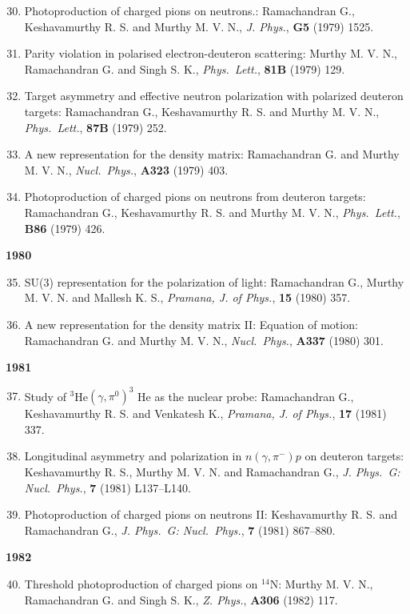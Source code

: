 \begin{enumerate}
\setcounter{enumi}{29}
\item Photoproduction of charged pions on neutrons.: Ramachandran G., Keshavamurthy R. S. and Murthy M. V. N., \textit{J. Phys.}, {\bf G5} (1979) 1525.
\item Parity violation in polarised electron-deuteron scattering: Murthy M. V. N., Ramachandran G. and Singh S. K., \textit{Phys.\ Lett.}, {\bf 81B} (1979) 129.
\item Target asymmetry and effective neutron polarization with polarized deuteron targets: Ramachandran G., Keshavamurthy R. S. and Murthy M. V. N., \textit{Phys.\ Lett.}, {\bf 87B} (1979) 252.
\item A new representation for the density matrix: Ramachandran G. and Murthy M. V. N., \textit{Nucl.\ Phys.}, {\bf A323} (1979) 403.
\item Photoproduction of charged pions on neutrons from deuteron targets: Ramachandran G., Keshavamurthy R. S. and Murthy M. V. N., \textit{Phys.\ Lett.}, {\bf B86} (1979) 426.
\end{enumerate}
\textbf{1980}
\begin{enumerate}
\setcounter{enumi}{34}
\item SU(3) representation for the polarization of light: Ramachandran G., Murthy M. V. N. and Mallesh K. S., \textit{Pramana, J. of Phys.}, {\bf 15} (1980) 357.
\item A new representation for the density matrix II: Equation of motion: Ramachandran G. and Murthy M. V. N., \textit{Nucl.\ Phys.}, {\bf A337} (1980) 301.
\end{enumerate}
\textbf{1981}
\begin{enumerate}
\setcounter{enumi}{36}
\item Study of $^{3}$He$(\gamma,\pi^{0})^{3}$ He as the nuclear probe: Ramachandran G., Keshavamurthy R. S. and Venkatesh K., \textit{Pramana, J. of Phys.}, {\bf 17} (1981) 337.
\item Longitudinal asymmetry and polarization in $n(\gamma,\pi^{-})p$ on deuteron targets: Keshavamurthy R. S., Murthy M. V. N. and Ramachandran G., \textit{J. Phys.\ G: Nucl.\ Phys.}, {\bf 7} (1981) L137--L140.
\item Photoproduction of charged pions on neutrons II: Keshavamurthy R. S. and Ramachandran G., \textit{J. Phys.\ G: Nucl.\ Phys.}, {\bf 7} (1981) 867--880.
\end{enumerate}
\textbf{1982}
\begin{enumerate}
\setcounter{enumi}{39}
\item Threshold photoproduction of charged pions on $^{14}$N: Murthy M. V. N., Ramachandran G. and Singh S. K., \textit{Z. Phys.}, {\bf A306} (1982) 117.
\end{enumerate}
